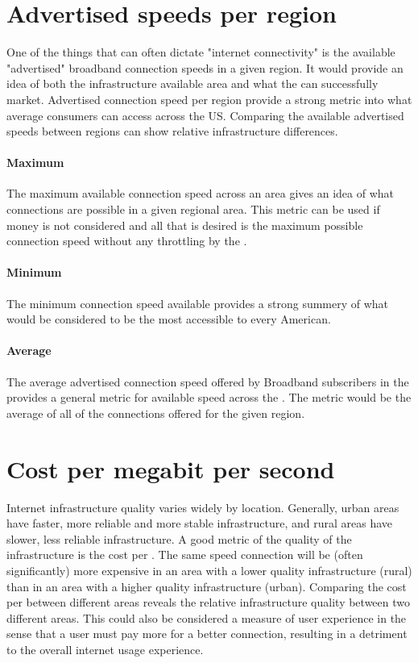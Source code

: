 \section{Advertised speeds per region}
One of the things that can often dictate "internet connectivity" is the available "advertised" broadband connection speeds in a given region. It would provide an idea of both the infrastructure available area and what the \isp can successfully market. Advertised connection speed per region provide a strong metric into what average consumers can access across the US. Comparing the available advertised speeds between regions can show relative infrastructure differences.

\paragraph{Maximum}
The maximum available connection speed across an area gives an idea of what connections are possible in a given regional area. This metric can be used if money is not considered and all that is desired is the maximum possible connection speed without any throttling by the \isp.

\paragraph{Minimum}
The minimum connection speed available provides a strong summery of what would be considered to be the most accessible to every American.

\paragraph{Average}
The average advertised connection speed offered by Broadband subscribers in the \us provides a general metric for available speed across the \us. The metric would be the average of all of the connections offered for the given region. 

\section{Cost per megabit per second}
Internet infrastructure quality varies widely by location. Generally, urban areas have faster, more reliable and more stable infrastructure, and rural areas have slower, less reliable infrastructure. A good metric of the quality of the infrastructure is the cost per \mbps. The same speed connection will be (often significantly) more expensive in an area with a lower quality infrastructure (rural) than in an area with a higher quality infrastructure (urban). Comparing the cost per \mbps between different areas reveals the relative infrastructure quality between two different areas. This could also be considered a measure of user experience in the sense that a user must pay more for a better connection, resulting in a detriment to the overall internet usage experience.

